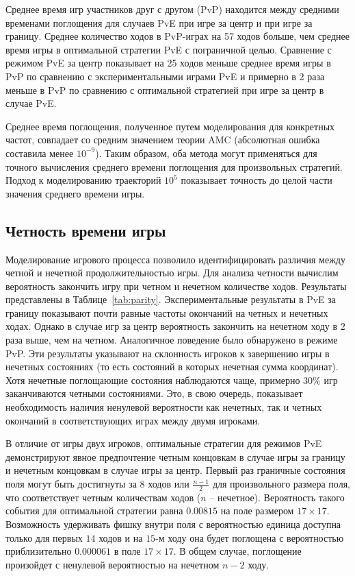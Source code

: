 Среднее время игр участников друг с другом (PvP) находится между средними временами поглощения для случаев PvE при игре за центр и при игре за границу. Среднее количество ходов в PvP-играх на 57 ходов больше, чем среднее время игры в оптимальной стратегии PvE с пограничной целью. Сравнение с режимом PvE за центр показывает на 25 ходов меньше среднее время игры в PvP по сравнению с экспериментальными играми PvE и примерно в 2 раза меньше в PvP по сравнению с оптимальной стратегией при игре за центр в случае PvE.

Среднее время поглощения, полученное путем моделирования для конкретных частот, совпадает со средним значением теории AMC (абсолютная ошибка составила менее $10^{-9}$). Таким образом, оба метода могут применяться для точного вычисления среднего времени поглощения для произвольных стратегий. Подход к моделированию траекторий $10^5$ показывает точность до целой части значения среднего времени игры.

\subsection{Четность времени игры}\label{subsec:ch3/sec4/sub2}

Моделирование игрового процесса позволило идентифицировать различия между четной и нечетной продолжительностью игры. 
Для анализа четности вычислим вероятность закончить игру при четном и нечетном количестве ходов.
Результаты представлены в Таблице~\cref{tab:parity}. Экспериментальные результаты в PvE за границу показывают почти равные частоты окончаний на четных и нечетных ходах. 
Однако в случае игр за центр вероятность закончить на нечетном ходу в $2$ раза выше, чем на четном. Аналогичное поведение было обнаружено в режиме PvP. 
Эти результаты указывают на склонность игроков к завершению игры в нечетных состояниях (то есть состояний в которых нечетная сумма координат). 
Хотя нечетные поглощающие состояния наблюдаются чаще, примерно $30\%$ игр заканчиваются четными состояниями. 
Это, в свою очередь, показывает необходимость наличия ненулевой вероятности как нечетных, так и четных окончаний в соответствующих играх между двумя игроками.

В отличие от игры двух игроков, оптимальные стратегии для режимов PvE демонстрируют явное предпочтение четным концовкам в случае игры за границу и 
нечетным концовкам в случае игры за центр. Первый раз граничные состояния поля могут быть достигнуты за $8$ ходов или $\frac{n-1}{2}$ для произвольного размера поля, 
что соответствует четным количествам ходов ($n$ -- нечетное). Вероятность такого события для оптимальной стратегии равна $0.00815$ на поле размером $17 \times 17$. 
Возможность удерживать фишку внутри поля с вероятностью единица доступна только для первых $14$ ходов и на $15$-м ходу она будет поглощена с вероятностью 
приблизительно $0.000061$ в поле $17 \times 17$. В общем случае, поглощение произойдет с ненулевой вероятностью на нечетном $n-2$ ходу.

